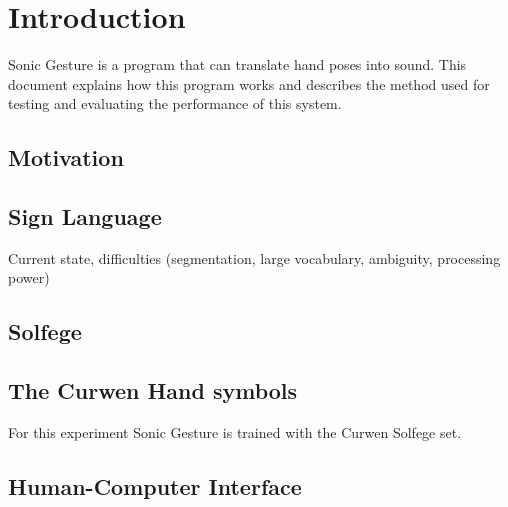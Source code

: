 \chapter{Introduction}
\label{ch:intro}

Sonic Gesture is a program that can translate hand poses into sound. This
document explains how this program works and describes the method used for
testing and evaluating the performance of this system.

\section{Motivation}

\section{Sign Language}
Current state, difficulties (segmentation, large vocabulary, ambiguity, processing power)

\section{Solfege}


\section{The Curwen Hand symbols}
For this experiment Sonic Gesture is trained with the Curwen Solfege set\cite{choksy1999}.

\section{Human-Computer Interface}
